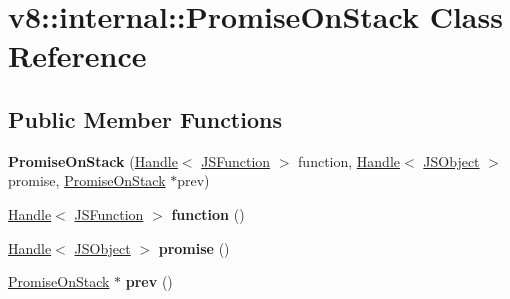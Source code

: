 \hypertarget{classv8_1_1internal_1_1_promise_on_stack}{}\section{v8\+:\+:internal\+:\+:Promise\+On\+Stack Class Reference}
\label{classv8_1_1internal_1_1_promise_on_stack}
\subsection*{Public Member Functions}
\begin{DoxyCompactItemize}
\item 
{\bfseries Promise\+On\+Stack} (\hyperlink{classv8_1_1internal_1_1_handle}{Handle}$<$ \hyperlink{classv8_1_1internal_1_1_j_s_function}{J\+S\+Function} $>$ function, \hyperlink{classv8_1_1internal_1_1_handle}{Handle}$<$ \hyperlink{classv8_1_1internal_1_1_j_s_object}{J\+S\+Object} $>$ promise, \hyperlink{classv8_1_1internal_1_1_promise_on_stack}{Promise\+On\+Stack} $\ast$prev)\hypertarget{classv8_1_1internal_1_1_promise_on_stack_af41c6dbd5244081600e68b2aa3113f8e}{}\label{classv8_1_1internal_1_1_promise_on_stack_af41c6dbd5244081600e68b2aa3113f8e}

\item 
\hyperlink{classv8_1_1internal_1_1_handle}{Handle}$<$ \hyperlink{classv8_1_1internal_1_1_j_s_function}{J\+S\+Function} $>$ {\bfseries function} ()\hypertarget{classv8_1_1internal_1_1_promise_on_stack_a5ea243e57bf9bcf4778970c63b23c6f3}{}\label{classv8_1_1internal_1_1_promise_on_stack_a5ea243e57bf9bcf4778970c63b23c6f3}

\item 
\hyperlink{classv8_1_1internal_1_1_handle}{Handle}$<$ \hyperlink{classv8_1_1internal_1_1_j_s_object}{J\+S\+Object} $>$ {\bfseries promise} ()\hypertarget{classv8_1_1internal_1_1_promise_on_stack_ae7cce8bf18b81022392d3194232d6600}{}\label{classv8_1_1internal_1_1_promise_on_stack_ae7cce8bf18b81022392d3194232d6600}

\item 
\hyperlink{classv8_1_1internal_1_1_promise_on_stack}{Promise\+On\+Stack} $\ast$ {\bfseries prev} ()\hypertarget{classv8_1_1internal_1_1_promise_on_stack_a520700e3bc23ba52968129f8540b2984}{}\label{classv8_1_1internal_1_1_promise_on_stack_a520700e3bc23ba52968129f8540b2984}

\end{DoxyCompactItemize}
